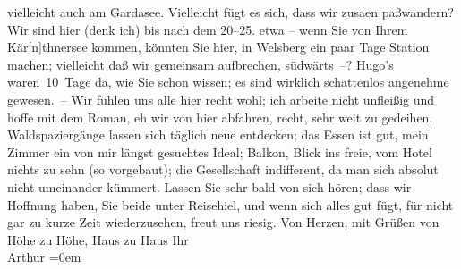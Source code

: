 \begin{ledgroupsized}[t]{13cm}
               vielleicht auch am Gardasee. Vielleicht fügt es
               sich, dass wir zusa{\geminationm}en paßwandern? Wir sind hier (denk
               ich) bis nach dem 20–25. etwa – wenn Sie von Ihrem Kär{[}n{]}thnersee kommen, könnten Sie
               hier, in Welsberg ein paar Tage {\pb}Station machen; vielleicht daß wir gemeinsam
               aufbrechen, südwärts –?\pend
           \pstart
           Hugo’s waren 10 Tage da, wie Sie schon
               wissen; es sind wirklich schattenlos angenehme gewesen. – Wir fühlen uns alle hier
               recht wohl; ich arbeite nicht unfleißig und hoffe mit dem Roman, eh wir von hier abfahren, recht, sehr
               weit zu gedeihen. Waldspaziergänge lassen sich täglich neue entdecken; das Essen ist
               gut, mein Zimmer ein von mir längst gesuchtes Ideal; Balkon, Blick ins freie, vom
               Hotel nichts zu sehn (so vorgebaut); die Gesellschaft indifferent, da man sich
               absolut nicht umeinander kümmert.\pend
           \pstart
           Lassen Sie sehr bald von sich hören; dass wir Hoffnung haben, Sie beide unter
                  Reisehi{\geminationm}el, und wenn sich alles gut fügt, für nicht
               gar zu kurze Zeit wiederzusehen, freut uns riesig.\pend
           \pstart
           Von Herzen, mit Grüßen von Höhe zu Höhe, Haus zu Haus\pend
           \pstart
           Ihr{\\[\baselineskip]}\spacefill\mbox{Arthur}\pend
           \leftskip=0em{}
         
         \endnumbering{}\end{ledgroupsized}  \newcommand{\dateiname}{L01695}\newcommand{\titel}{Arthur Schnitzler an Richard Beer-Hofmann, 29. 7. 1907}\newcommand{\editorInnen}{Martin Anton Müller und Gerd-Hermann Susen}
      